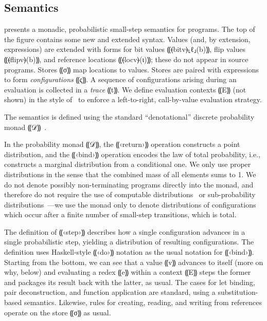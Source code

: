 \subsection{Semantics}
\label{subsec:obliv-design-sem}

 presents a monadic, probabilistic small-step
semantics for \obliv programs. The top of the figure contains some new and
extended syntax. Values (and, by extension, expressions) are extended with
forms for bit values ⸨⦑bitv⦒⸤ℓ⸥(b)⸩, flip values ⸨⦑flipv⦒(b)⸩, and
reference locations ⸨⦑locv⦒(ι)⸩; these do not appear in source programs. Stores
⸨σ⸩ map locations to values. Stores are paired with expressions to form
\emph{configurations} ⸨ς⸩. A sequence of configurations arising during an
evaluation is collected in a \emph{trace} ⸨t⸩.  We define evaluation
contexts ⸨E⸩ (not shown) in the style of~\citet{felleisen1992revised} to enforce a
left-to-right, call-by-value evaluation strategy.

The semantics is defined using the standard “denotational” discrete probability monad
⸨𝒟⸩~\cite{10.1007/BFb0092872,Ramsey:2002:SLC:503272.503288}.

In the probability monad ⸨𝒟⸩, the ⸨‹return›⸩ operation constructs a point
distribution, and the ⸨‹bind›⸩ operation encodes the law of total probability,
{i.e.}, constructs a marginal distribution from a conditional one. We only use
proper distributions in the sense that the combined mass of all elements sums
to 1. We do not denote possibly non-terminating programs directly into the
monad, and therefore do not require the use of computable
distributions~\cite{huang-computable-distributions} or
sub-probability distributions~\cite{monniaux-ai-prob}—we use the monad only to denote distributions of
configurations which occur after a finite number of small-step transitions,
which is total.

The definition of ⸨‹step›⸩ describes how a single configuration advances in a
single probabilistic step, yielding a distribution of resulting configurations.
The definition uses Haskell-style ⸨‹do›⸩ notation as the usual notation for
⸨‹bind›⸩. Starting from the bottom, we can see that a value ⸨v⸩ advances to
itself (more on why, below) and evaluating a redex ⸨e⸩ within a context ⸨E⸩
steps the former and packages its result back with the latter, as usual. The
cases for let binding, pair deconstruction, and function application are
standard, using a substitution-based semantics. Likewise, rules for creating,
reading, and writing from references operate on the store ⸨σ⸩ as
usual.


